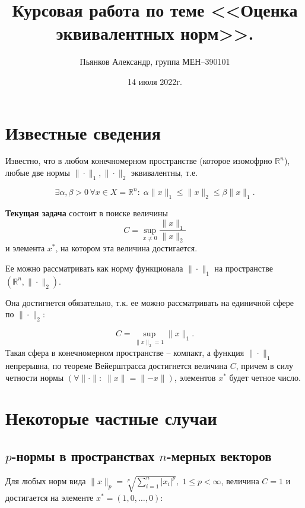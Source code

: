 \documentclass{article}
\begin{document}
\title{Курсовая работа по теме <<Оценка эквивалентных норм>>.}

\author{Пьянков Александр, группа МЕН--390101}

\date{14 июля 2022г.}

\maketitle

\tableofcontents

\newpage
\section{Известные сведения}

Известно, что в любом конечномерном пространстве (которое изомофрно $\mathbb{R}^n$), любые две нормы $\|{\cdot}\|_1, \|{\cdot}\|_2$ эквивалентны, т.е.

$$ \exists \alpha, \beta > 0 \, \forall x \in X = \mathbb{R}^n: \; \alpha\|x\|_1 \leqslant \|x\|_2 \leqslant \beta \|x\|_1. $$

\textbf{Текущая задача} состоит в поиске величины 
$$ C = \sup\limits_{x \neq 0} \frac{\|x\|_1}{\|x\|_2} $$ 
и элемента $x^*$, на котором эта величина достигается.

Ее можно рассматривать как норму функционала $\|{\cdot}\|_1$ на пространстве $(\mathbb{R}^n, \|{\cdot}\|_2).$

Она достигнется обязательно, т.к. ее можно рассматривать на единичной сфере по $\|{\cdot}\|_2$: 

$$ C = \sup\limits_{\|x\|_2=1}{\|x\|_1}. $$
Такая сфера в конечномерном пространстве -- компакт, а функция $\|{\cdot}\|_1$ непрерывна, по теореме Вейерштрасса достигнется величина $C$, причем в силу четности нормы $(\forall \|{\cdot}\|: \; \|x\| = \|{-x}\|)$, элементов $x^*$ будет четное число.

\newpage
\section{Некоторые частные случаи}

\subsection{\texorpdfstring{\boldmath$p$}{p}-нормы в пространствах \texorpdfstring{\boldmath$n$}{n}-мерных векторов}

Для любых норм вида $ \|x\|_p = \sqrt[p]{\sum\limits_{i=1}^n{|x_i|^p}}, \; 1 \leqslant p < \infty $, величина $C = 1$ и достигается на элементе $x^*=(1,0,\ldots,0)$:
\end{document}
